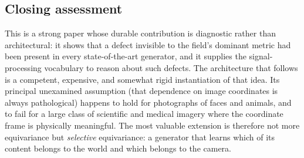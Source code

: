 \documentclass[11pt,a4paper]{article}
\begin{document}
\subsection*{Closing assessment}

This is a strong paper whose durable contribution is diagnostic rather than
architectural: it shows that a defect invisible to the field's dominant metric
had been present in every state-of-the-art generator, and it supplies the
signal-processing vocabulary to reason about such defects. The architecture that
follows is a competent, expensive, and somewhat rigid instantiation of that idea.
Its principal unexamined assumption (that dependence on image coordinates is
always pathological) happens to hold for photographs of faces and animals, and
to fail for a large class of scientific and medical imagery where the coordinate
frame is physically meaningful. The most valuable extension is therefore not more
equivariance but \emph{selective} equivariance: a generator that learns which of
its content belongs to the world and which belongs to the camera.



\end{document}
